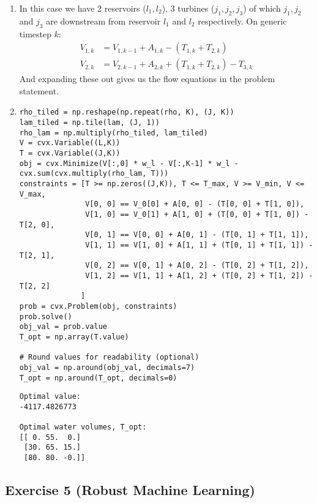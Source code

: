 \documentclass[11pt]{article}
\begin{document}
\begin{solution}
\begin{enumerate}
    \item In this case we have 2 reservoirs ($l_1, l_2$), 3 turbines ($j_1, j_2, j_3$) of which $j_1, j_2$ and $j_3$ are downstream from reservoir $l_1$ and $l_2$ respectively. On generic timestep $k$:
    \begin{align*}
        V_{1,k} &= V_{1,k-1} + A_{1,k} - (T_{1,k} + T_{2,k}) \\
        V_{2,k} &= V_{2,k-1} + A_{2,k} + (T_{1,k} + T_{2,k}) - T_{3,k}
    \end{align*}
    And expanding these out gives us the flow equations in the problem statement.

    \item
    \begin{verbatim}
rho_tiled = np.reshape(np.repeat(rho, K), (J, K))
lam_tiled = np.tile(lam, (J, 1))
rho_lam = np.multiply(rho_tiled, lam_tiled)
V = cvx.Variable((L,K))
T = cvx.Variable((J,K))
obj = cvx.Minimize(V[:,0] * w_l - V[:,K-1] * w_l - cvx.sum(cvx.multiply(rho_lam, T)))
constraints = [T >= np.zeros((J,K)), T <= T_max, V >= V_min, V <= V_max,
               V[0, 0] == V_0[0] + A[0, 0] - (T[0, 0] + T[1, 0]),
               V[1, 0] == V_0[1] + A[1, 0] + (T[0, 0] + T[1, 0]) - T[2, 0],
               V[0, 1] == V[0, 0] + A[0, 1] - (T[0, 1] + T[1, 1]),
               V[1, 1] == V[1, 0] + A[1, 1] + (T[0, 1] + T[1, 1]) - T[2, 1],
               V[0, 2] == V[0, 1] + A[0, 2] - (T[0, 2] + T[1, 2]),
               V[1, 2] == V[1, 1] + A[1, 2] + (T[0, 2] + T[1, 2]) - T[2, 2]
              ]
prob = cvx.Problem(obj, constraints)
prob.solve()
obj_val = prob.value
T_opt = np.array(T.value)

# Round values for readability (optional)
obj_val = np.around(obj_val, decimals=7)
T_opt = np.around(T_opt, decimals=0)
    \end{verbatim}
    \begin{verbatim}
Optimal value:
-4117.4826773

Optimal water volumes, T_opt:
[[ 0. 55.  0.]
 [30. 65. 15.]
 [80. 80. -0.]]
    \end{verbatim}
\end{enumerate}
\end{solution}

\newpage
\subsection*{Exercise 5 (Robust Machine Learning)}
\end{document}
